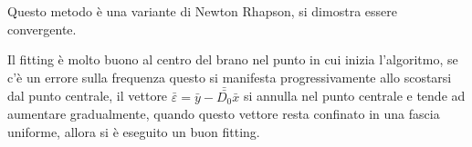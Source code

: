 Questo metodo è una variante di Newton Rhapson, si dimostra essere convergente.



Il fitting è molto buono al centro del brano nel punto in cui inizia
l'algoritmo, se c'è un errore sulla frequenza questo si manifesta
progressivamente allo scostarsi dal punto centrale, il vettore
$\bar{\varepsilon} = \bar{y} - \bar{\bar{D_0}}\bar{x}$ si annulla nel punto
centrale e tende ad aumentare gradualmente, quando questo vettore resta
confinato in una fascia uniforme, allora si è eseguito un buon fitting.






